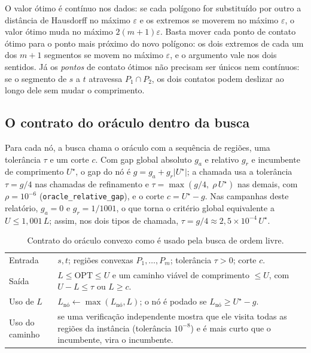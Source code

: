\documentclass[11pt,a4paper]{article}
\theoremstyle{plain}\newtheorem{proposicao}{Proposição}
\theoremstyle{definition}\newtheorem{definicao}{Definição}
\theoremstyle{plain}\newtheorem{teorema}{Teorema}
\newcommand{\abs}[1]{\lvert#1\rvert}
\newcommand{\OPT}{\mathrm{OPT}}
\newcommand{\code}[1]{\texttt{\small #1}}
\begin{document}
O valor ótimo é contínuo nos dados: se cada polígono for substituído por outro a distância de Hausdorff no máximo \(\varepsilon\) e os extremos se moverem no máximo \(\varepsilon\), o valor ótimo muda no máximo \(2(m+1)\varepsilon\). Basta mover cada ponto de contato ótimo para o ponto mais próximo do novo polígono: os dois extremos de cada um dos \(m+1\) segmentos se movem no máximo \(\varepsilon\), e o argumento vale nos dois sentidos. Já os \emph{pontos} de contato ótimos não precisam ser únicos nem contínuos: se o segmento de \(s\) a \(t\) atravessa \(P_1\cap P_2\), os dois contatos podem deslizar ao longo dele sem mudar o comprimento.

\subsection{O contrato do oráculo dentro da busca}\label{sec:contrato}
Para cada nó, a busca chama o oráculo com a sequência de regiões, uma tolerância \(\tau\) e um corte \(c\). Com gap global absoluto \(g_a\) e relativo \(g_r\) e incumbente de comprimento \(U^\star\), o gap do nó é \(g=g_a+g_r\abs{U^\star}\); a chamada usa a tolerância \(\tau=g/4\) nas chamadas de refinamento e \(\tau=\max(g/4,\;\rho\,U^\star)\) nas demais, com \(\rho=10^{-6}\) (\code{oracle\_relative\_gap}), e o corte \(c=U^\star-g\). Nas campanhas deste relatório, \(g_a=0\) e \(g_r=1/1001\), o que torna o critério global equivalente a \(U\le1{,}001\,L\); assim, nos dois tipos de chamada, \(\tau=g/4\approx2{,}5\times10^{-4}\,U^\star\).

\begin{table}[ht]\centering\small
\begin{tabular}{@{}p{30mm}p{110mm}@{}}\toprule
Entrada & \(s,t\); regiões convexas \(P_1,\dots,P_m\); tolerância \(\tau>0\); corte \(c\).\\
Saída & \(L\le\OPT\le U\) e um caminho viável de comprimento \(\le U\), com \(U-L\le\tau\) ou \(L\ge c\).\\
Uso de \(L\) & \(L_{\text{nó}}\gets\max(L_{\text{nó}},L)\); o nó é podado se \(L_{\text{nó}}\ge U^\star-g\).\\
Uso do caminho & se uma verificação independente mostra que ele visita todas as regiões da instância (tolerância \(10^{-8}\)) e é mais curto que o incumbente, vira o incumbente.\\\bottomrule
\end{tabular}
\caption{Contrato do oráculo convexo como é usado pela busca de ordem livre.}\label{tab:contrato}
\end{table}
\end{document}
